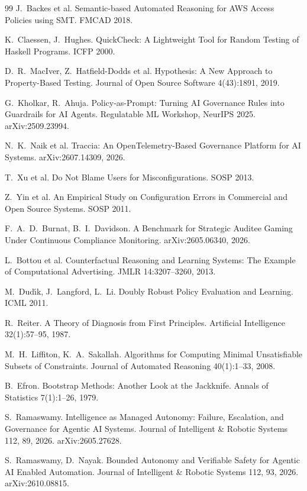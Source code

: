 \documentclass[11pt]{article}
\begin{document}
\begin{thebibliography}{99}
 J.~Backes et al. Semantic-based Automated Reasoning for AWS Access Policies
using SMT. FMCAD 2018.

 K.~Claessen, J.~Hughes. QuickCheck: A Lightweight Tool for Random Testing of
Haskell Programs. ICFP 2000.

 D.~R.~MacIver, Z.~Hatfield-Dodds et al. Hypothesis: A New Approach to
Property-Based Testing. Journal of Open Source Software 4(43):1891, 2019.

 G.~Kholkar, R.~Ahuja. Policy-as-Prompt: Turning AI Governance Rules into
Guardrails for AI Agents. Regulatable ML Workshop, NeurIPS 2025. arXiv:2509.23994.

 N.~K.~Naik et al. Traccia: An OpenTelemetry-Based Governance Platform for AI
Systems. arXiv:2607.14309, 2026.

 T.~Xu et al. Do Not Blame Users for Misconfigurations. SOSP 2013.

 Z.~Yin et al. An Empirical Study on Configuration Errors in Commercial and Open
Source Systems. SOSP 2011.

 F.~A.~D.~Burnat, B.~I.~Davidson. A Benchmark for Strategic Auditee Gaming
Under Continuous Compliance Monitoring. arXiv:2605.06340, 2026.

 L.~Bottou et al. Counterfactual Reasoning and Learning Systems: The Example of
Computational Advertising. JMLR 14:3207--3260, 2013.

 M.~Dud\'{\i}k, J.~Langford, L.~Li. Doubly Robust Policy Evaluation and Learning.
ICML 2011.

 R.~Reiter. A Theory of Diagnosis from First Principles. Artificial Intelligence
32(1):57--95, 1987.

 M.~H.~Liffiton, K.~A.~Sakallah. Algorithms for Computing Minimal
Unsatisfiable Subsets of Constraints. Journal of Automated Reasoning 40(1):1--33, 2008.

 B.~Efron. Bootstrap Methods: Another Look at the Jackknife. Annals of Statistics
7(1):1--26, 1979.

 S.~Ramaswamy. Intelligence as Managed Autonomy: Failure, Escalation, and
Governance for Agentic AI Systems. Journal of Intelligent \& Robotic Systems 112, 89, 2026.
arXiv:2605.27628.

 S.~Ramaswamy, D.~Nayak. Bounded Autonomy and Verifiable Safety for Agentic
AI Enabled Automation. Journal of Intelligent \& Robotic Systems 112, 93, 2026.
arXiv:2610.08815.


\end{thebibliography}
\end{document}
